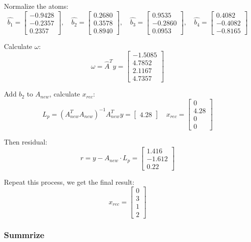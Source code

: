 \documentclass[12pt]{ctexart}
\begin{document}
Normalize the atoms:
\[
  \hat{b_1} = \begin{bmatrix}-0.9428 \\ -0.2357 \\ 0.2357\end{bmatrix}, \quad
  \hat{b_2} = \begin{bmatrix}0.2680 \\ 0.3578 \\ 0.8940\end{bmatrix}, \quad
  \hat{b_3} = \begin{bmatrix}0.9535 \\ -0.2860 \\ 0.0953\end{bmatrix}, \quad
  \hat{b_4} = \begin{bmatrix}0.4082 \\ -0.4082 \\ -0.8165\end{bmatrix}
\]

Calculate $\omega$:
\[
  \omega = \hat{A}^Ty = \begin{bmatrix} -1.5085 \\ 4.7852 \\ 2.1167 \\ 4.7357
  \end{bmatrix}
\]

Add $b_2$ to $A_{new}$, calculate $x_{rec}$:
\[
  L_p = (A_{new}^TA_{new})^{-1}A_{new}^Ty = \begin{bmatrix} 4.28 \end{bmatrix} \quad
  x_{rec} = \begin{bmatrix} 0 \\ 4.28 \\ 0 \\ 0 \end{bmatrix}
\]

Then residual:
\[
  r = y - A_{new} \cdot L_p = \begin{bmatrix} 1.416 \\ -1.612 \\ 0.22 \end{bmatrix}
\]

Repeat this process, we get the final result:
\[
  x_{rec} = \begin{bmatrix} 0 \\ 3 \\ 1 \\ 2 \end{bmatrix}
\]

\subsubsection{\textbf{Summrize}}
\end{document}

